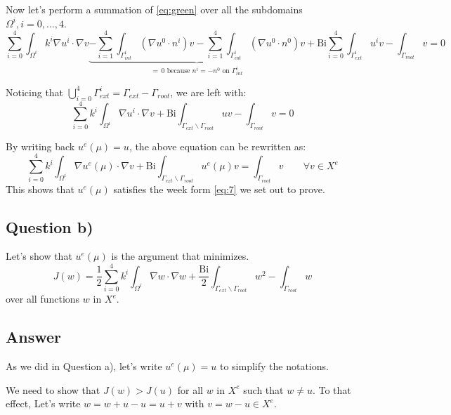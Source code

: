 \documentclass[
	english,
	11pt, %
]{fphw}
\newcommand{\bi}{\text{Bi}}
\begin{document}
\noindent Now let's perform a summation of \eqref{eq:green} over all the subdomains $\Omega^i, i=0,\ldots,4$.
$$
\sum_{i=0}^4 \int_{\Omega^i}k^i \nabla u^i \cdot \nabla v \underbrace{- \sum_{i=1}^4 \int_{\Gamma_{int}^i}  \left( \nabla u^0 \cdot n^i \right) v - \sum_{i=1}^4 \int_{\Gamma_{int}^i}  \left( \nabla u^0 \cdot n^0 \right) v}_{=\, 0 \text{ because } n^i = -n^0 \text{ on } \Gamma_{int}^i} + \bi \sum_{i=0}^4 \int_{\Gamma_{ext}^i} u^i v -\int_{\Gamma_{root}} v  = 0 
$$

\noindent Noticing that $\bigcup_{i=0}^4 \Gamma_{ext}^i = \Gamma_{ext} - \Gamma_{root}$, we are left with:
$$
\sum_{i=0}^4 k^i \int_{\Omega^i} \nabla u^i \cdot \nabla v + \bi \int_{\Gamma_{ext} \backslash \Gamma_{root}} u v -\int_{\Gamma_{root}} v  = 0 
$$

\noindent By writing back $u^e({\mu}) = u$, the above equation can be rewritten as:
$$
\sum_{i=0}^4 k^i \int_{\Omega^i} \nabla u^e({\mu}) \cdot \nabla v + \bi \int_{\Gamma_{ext} \backslash \Gamma_{root}} u^e({\mu}) v = \int_{\Gamma_{root}} v \qquad \forall v \in X^e 
$$
This shows that $u^e({\mu})$ satisfies the week form \eqref{eq:7} we set out to prove.




\subsection*{Question b)}
\begin{problem}
	Let's show that $u^e(\mu)$ is the argument that minimizes.
	\begin{equation}
		\tag{8}\label{eq:J}
		J(w) = \frac{1}{2} \sum_{i=0}^4 k^i \int_{\Omega^i} \nabla w \cdot \nabla w + \frac{\bi}{2} \int_{\Gamma_{ext} \backslash \Gamma_{root}} w^2 -\int_{\Gamma_{root}} w
	\end{equation}
	over all functions $w$ in $X^e$.
\end{problem}


\subsection*{Answer} 

As we did in Question a), let's write $u^e(\mu) = u$ to simplify the notations. 

\noindent We need to show that $J(w)>J(u)$ for all $w$ in $X^e$ such that $w \neq u$. 
To that effect, Let's write $w = w + u - u = u + v$ with $v = w-u \in X^e$. 
\end{document}
